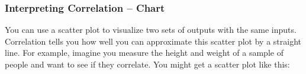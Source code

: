 \documentclass[aspectratio=169,11pt,svgnames]{beamer}
\begin{document}
\begin{frame}
 \frametitle{Interpreting Correlation -- Chart}
 You can use a scatter plot to visualize two sets of outputs with the same
 inputs.
 \pause
 Correlation tells you \alert{how well you can approximate} this scatter plot by
 a straight line.
 \pause
 For example, imagine you measure the height and weight of a sample of people
 and want to see if they correlate. You might get a scatter plot like this:
 \pause
 \begin{center}
 \end{center}
\end{frame}
\end{document}
